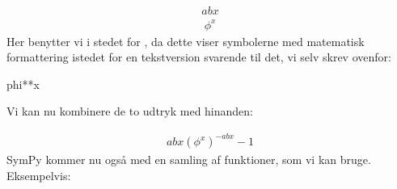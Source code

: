 \documentclass[letterpaper,10pt,english]{jupyterBook}
\begin{document}
\begin{sphinxVerbatim}[commandchars=\\\{\}]
      
     

\end{sphinxVerbatim}
\begin{equation*}
\begin{split}\displaystyle a b x\end{split}
\end{equation*}\begin{equation*}
\begin{split}\displaystyle \phi^{x}\end{split}
\end{equation*}
Her benytter vi  i stedet for , da dette viser symbolerne med matematisk formattering istedet for en tekst\sphinxhyphen{}version svarende til det, vi selv skrev ovenfor:

\begin{sphinxVerbatim}[commandchars=\\\{\}]
\end{sphinxVerbatim}

\begin{sphinxVerbatim}[commandchars=\\\{\}]
phi**x
\end{sphinxVerbatim}

Vi kan nu kombinere de to udtryk med hinanden:

\begin{sphinxVerbatim}[commandchars=\\\{\}]
      
\end{sphinxVerbatim}
\begin{equation*}
\begin{split}\displaystyle a b x \left(\phi^{x}\right)^{- a b x} - 1\end{split}
\end{equation*}
SymPy kommer nu også med en samling af funktioner, som vi kan bruge. Eksempelvis:
\end{document}

